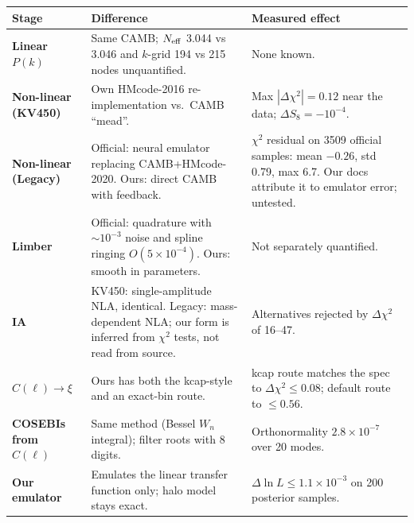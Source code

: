 \documentclass[10pt,a4paper]{article}
\begin{document}
\begin{tabularx}{\textwidth}{@{}>{\bfseries}p{2.6cm}YY@{}}
\toprule
Stage & Difference & Measured effect \\
\midrule
Linear $P(k)$ & Same CAMB; $N_{\rm eff}$ 3.044 vs 3.046 and $k$-grid 194 vs 215 nodes unquantified. & None known. \\
Non-linear (KV450) & Own HMcode-2016 re-implementation vs.\ CAMB ``mead''. & Max $|\Delta\chi^2|=0.12$ near the data; $\Delta S_8=-10^{-4}$. \\
Non-linear (Legacy) & Official: neural emulator replacing CAMB+HMcode-2020. Ours: direct CAMB with feedback. & $\chi^2$ residual on 3509 official samples: mean $-0.26$, std 0.79, max 6.7. Our docs attribute it to emulator error; untested. \\
Limber & Official: quadrature with $\sim10^{-3}$ noise and spline ringing $O(5\times10^{-4})$. Ours: smooth in parameters. & Not separately quantified. \\
IA & KV450: single-amplitude NLA, identical. Legacy: mass-dependent NLA; our form is inferred from $\chi^2$ tests, not read from source. & Alternatives rejected by $\Delta\chi^2$ of 16--47. \\
$C(\ell)\to\xi$ & Ours has both the kcap-style and an exact-bin route. & kcap route matches the spec to $\Delta\chi^2\le0.08$; default route to $\le0.56$. \\
COSEBIs from $C(\ell)$ & Same method (Bessel $W_n$ integral); filter roots with 8 digits. & Orthonormality $2.8\times10^{-7}$ over 20 modes. \\
Our emulator & Emulates the linear transfer function only; halo model stays exact. & $\Delta\ln L\le1.1\times10^{-3}$ on 200 posterior samples. \\
\bottomrule
\end{tabularx}
\end{document}

